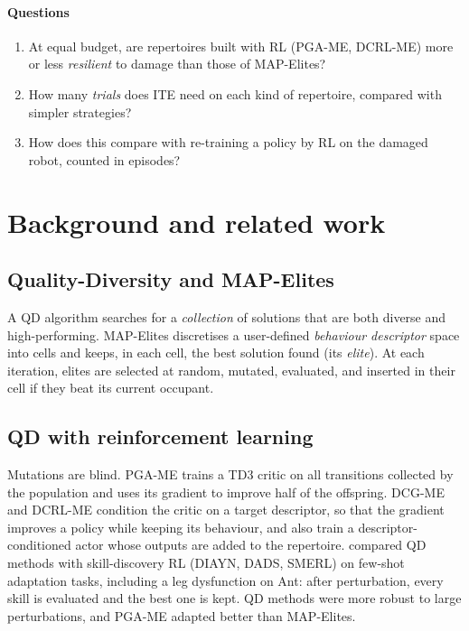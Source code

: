 \documentclass[11pt,a4paper]{article}
\newcommand{\ME}{MAP-Elites}
\newcommand{\PGA}{PGA-ME}
\newcommand{\DCRL}{DCRL-ME}
\begin{document}
\paragraph{Questions}
\begin{enumerate}[label=\textbf{Q\arabic*.},leftmargin=2.2em]
  \item At equal budget, are repertoires built with RL (\PGA, \DCRL) more or less \emph{resilient} to damage than
        those of \ME?
  \item How many \emph{trials} does ITE need on each kind of repertoire, compared with simpler strategies?
  \item How does this compare with re-training a policy by RL on the damaged robot, counted in episodes?
\end{enumerate}

\section{Background and related work}
\subsection{Quality-Diversity and MAP-Elites}
A QD algorithm searches for a \emph{collection} of solutions that are both diverse and high-performing.
MAP-Elites \citep{mouret2015illuminating} discretises a user-defined \emph{behaviour descriptor} space into cells
and keeps, in each cell, the best solution found (its \emph{elite}). At each iteration, elites are selected at
random, mutated, evaluated, and inserted in their cell if they beat its current occupant.

\subsection{QD with reinforcement learning}
Mutations are blind. PGA-ME \citep{nilsson2021policy} trains a TD3 critic on all transitions collected by the
population and uses its gradient to improve half of the offspring. DCG-ME and DCRL-ME \citep{faldor2024synergizing}
condition the critic on a target descriptor, so that the gradient improves a policy while keeping its behaviour,
and also train a descriptor-conditioned actor whose outputs are added to the repertoire.
\citet{chalumeau2023neuroevolution} compared QD methods with skill-discovery RL (DIAYN, DADS, SMERL) on few-shot
adaptation tasks, including a leg dysfunction on Ant: after perturbation, every skill is evaluated and the best
one is kept. QD methods were more robust to large perturbations, and PGA-ME adapted better than MAP-Elites.
\end{document}
